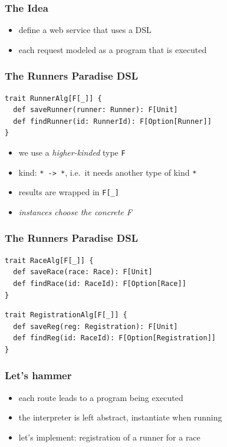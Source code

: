 \documentclass{beamer}
\begin{document}
\begin{frame}
  \frametitle{The Idea}
  \begin{itemize}
  \item define a web service that uses a DSL
  \item each request modeled as a program that is executed
  \end{itemize}
\end{frame}

\begin{frame}[fragile]
  \frametitle{The Runners Paradise DSL}
\begin{verbatim}
trait RunnerAlg[F[_]] {
  def saveRunner(runner: Runner): F[Unit]
  def findRunner(id: RunnerId): F[Option[Runner]]
}
\end{verbatim}
  \begin{itemize}
  \item we use a \textit{higher-kinded} type \texttt{F}
  \item kind: \texttt{* -> *}, i.e.\ it needs another type of kind
    \texttt{*}
  \item results are wrapped in \texttt{F[\_]}
  \item \textit{instances choose the concrete F}
  \end{itemize}
\end{frame}

\begin{frame}[fragile]
  \frametitle{The Runners Paradise DSL}
\begin{verbatim}
trait RaceAlg[F[_]] {
  def saveRace(race: Race): F[Unit]
  def findRace(id: RaceId): F[Option[Race]]
}
\end{verbatim}
\begin{verbatim}
trait RegistrationAlg[F[_]] {
  def saveReg(reg: Registration): F[Unit]
  def findReg(id: RaceId): F[Option[Registration]]
}
\end{verbatim}
\end{frame}

\begin{frame}
  \frametitle{Let's hammer}
  \begin{itemize}
  \item each route leads to a program being executed
  \item the interpreter is left abstract, instantiate when running
  \item let's implement: registration of a runner for a race
  \end{itemize}
\end{frame}
\end{document}

